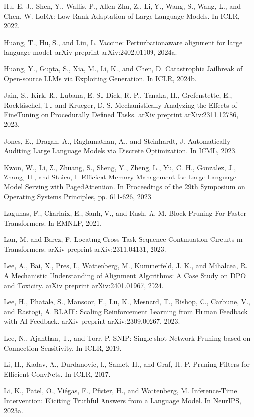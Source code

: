 \documentclass[10pt]{article}
\begin{document}
Hu, E. J., Shen, Y., Wallis, P., Allen-Zhu, Z., Li, Y., Wang, S., Wang, L., and Chen, W. LoRA: Low-Rank Adaptation of Large Language Models. In ICLR, 2022.

Huang, T., Hu, S., and Liu, L. Vaccine: Perturbationaware alignment for large language model. arXiv preprint arXiv:2402.01109, 2024a.

Huang, Y., Gupta, S., Xia, M., Li, K., and Chen, D. Catastrophic Jailbreak of Open-source LLMs via Exploiting Generation. In ICLR, 2024b.

Jain, S., Kirk, R., Lubana, E. S., Dick, R. P., Tanaka, H., Grefenstette, E., Rocktäschel, T., and Krueger, D. S. Mechanistically Analyzing the Effects of FineTuning on Procedurally Defined Tasks. arXiv preprint arXiv:2311.12786, 2023.

Jones, E., Dragan, A., Raghunathan, A., and Steinhardt, J. Automatically Auditing Large Language Models via Discrete Optimization. In ICML, 2023.

Kwon, W., Li, Z., Zhuang, S., Sheng, Y., Zheng, L., Yu, C. H., Gonzalez, J., Zhang, H., and Stoica, I. Efficient Memory Management for Large Language Model Serving with PagedAttention. In Proceedings of the 29th Symposium on Operating Systems Principles, pp. 611-626, 2023.

Lagunas, F., Charlaix, E., Sanh, V., and Rush, A. M. Block Pruning For Faster Transformers. In EMNLP, 2021.

Lan, M. and Barez, F. Locating Cross-Task Sequence Continuation Circuits in Transformers. arXiv preprint arXiv:2311.04131, 2023.

Lee, A., Bai, X., Pres, I., Wattenberg, M., Kummerfeld, J. K., and Mihalcea, R. A Mechanistic Understanding of Alignment Algorithms: A Case Study on DPO and Toxicity. arXiv preprint arXiv:2401.01967, 2024.

Lee, H., Phatale, S., Mansoor, H., Lu, K., Mesnard, T., Bishop, C., Carbune, V., and Rastogi, A. RLAIF: Scaling Reinforcement Learning from Human Feedback with AI Feedback. arXiv preprint arXiv:2309.00267, 2023.

Lee, N., Ajanthan, T., and Torr, P. SNIP: Single-shot Network Pruning based on Connection Sensitivity. In ICLR, 2019.

Li, H., Kadav, A., Durdanovic, I., Samet, H., and Graf, H. P. Pruning Filters for Efficient ConvNets. In ICLR, 2017.

Li, K., Patel, O., Viégas, F., Pfister, H., and Wattenberg, M. Inference-Time Intervention: Eliciting Truthful Answers from a Language Model. In NeurIPS, 2023a.
\end{document}
